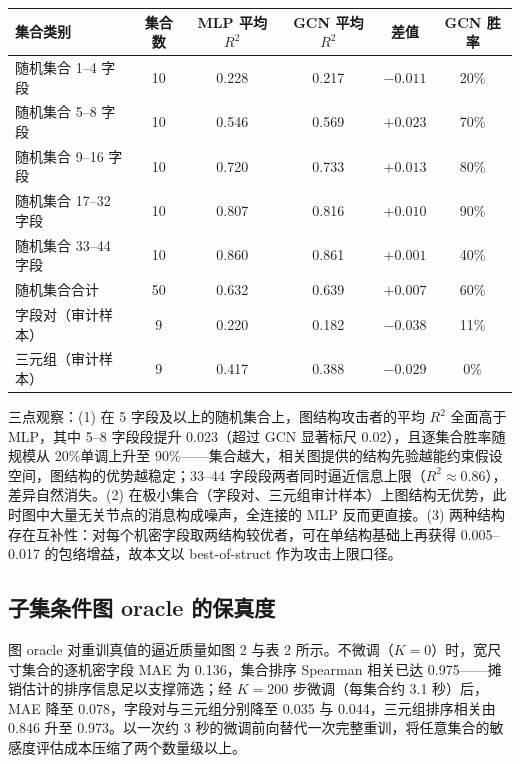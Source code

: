 \documentclass[10.5pt,compsoc,UTF8]{CjC}
\theoremstyle{mystyle}
\begin{document}
\begin{table}[htbp]
\vspace {1mm}
\begin{center}
\begin{tabular}{lccccc}
\toprule
集合类别 & 集合数 & MLP 平均 $R^2$ & GCN 平均 $R^2$ & 差值 & GCN 胜率 \\
\midrule
随机集合 1--4 字段   & 10 & 0.228 & 0.217 & $-0.011$ & 20\% \\
随机集合 5--8 字段   & 10 & 0.546 & 0.569 & $+0.023$ & 70\% \\
随机集合 9--16 字段  & 10 & 0.720 & 0.733 & $+0.013$ & 80\% \\
随机集合 17--32 字段 & 10 & 0.807 & 0.816 & $+0.010$ & 90\% \\
随机集合 33--44 字段 & 10 & 0.860 & 0.861 & $+0.001$ & 40\% \\
随机集合合计         & 50 & 0.632 & 0.639 & $+0.007$ & 60\% \\
字段对（审计样本）   & 9  & 0.220 & 0.182 & $-0.038$ & 11\% \\
三元组（审计样本）   & 9  & 0.417 & 0.388 & $-0.029$ & 0\%  \\
\bottomrule
\end{tabular}
\label{tab:attacker}
\end{center}
\end{table}

三点观察：(1) 在 5 字段及以上的随机集合上，图结构攻击者的平均 $R^2$ 全面高于 MLP，其中 5--8 字段段提升 0.023（超过 GCN 显著标尺 0.02），且逐集合胜率随规模从 20\%单调上升至 90\%——集合越大，相关图提供的结构先验越能约束假设空间，图结构的优势越稳定；33--44 字段段两者同时逼近信息上限（$R^2\approx0.86$），差异自然消失。(2) 在极小集合（字段对、三元组审计样本）上图结构无优势，此时图中大量无关节点的消息构成噪声，全连接的 MLP 反而更直接。(3) 两种结构存在互补性：对每个机密字段取两结构较优者，可在单结构基础上再获得 0.005--0.017 的包络增益，故本文以 best-of-struct 作为攻击上限口径。

\subsection{子集条件图 oracle 的保真度}

图 oracle 对重训真值的逼近质量如图 2 与表 2 所示。不微调（$K{=}0$）时，宽尺寸集合的逐机密字段 MAE 为 0.136，集合排序 Spearman 相关已达 0.975——摊销估计的排序信息足以支撑筛选；经 $K{=}200$ 步微调（每集合约 3.1 秒）后，MAE 降至 0.078，字段对与三元组分别降至 0.035 与 0.044，三元组排序相关由 0.846 升至 0.973。以一次约 3 秒的微调前向替代一次完整重训，将任意集合的敏感度评估成本压缩了两个数量级以上。
\end{document}
